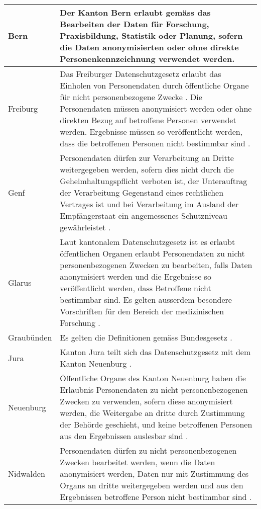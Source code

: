 \begin{longtable}{| p{} | p{}|}
		\hline
    Bern & Der Kanton Bern erlaubt gemäss \parencite[§§ 15 Abs. 1]{DSSGBERN} das Bearbeiten der Daten für Forschung, Praxisbildung, Statistik oder Planung, sofern die Daten anonymisierten oder ohne direkte Personenkennzeichnung verwendet werden. \\
		\hline
		Freiburg & Das Freiburger Datenschutzgesetz erlaubt das Einholen von Personendaten durch öffentliche Organe für nicht personenbezogene Zwecke \parencite[§§ 14 Abs. 1]{DSSGFR}. Die Personendaten müssen anonymisiert werden oder ohne direkten Bezug auf betroffene Personen verwendet werden. Ergebnisse müssen so veröffentlicht werden, dass die betroffenen Personen nicht bestimmbar sind \parencite[§ 16 Abs. 1-2]{DSSGFR}.  \\
		\hline
    Genf & Personendaten dürfen zur Verarbeitung an Dritte weitergegeben werden, sofern dies nicht durch die Geheimhaltungspflicht verboten ist, der Unterauftrag der Verarbeitung Gegenstand eines rechtlichen Vertrages ist und bei Verarbeitung im Ausland der Empfängerstaat ein angemessenes Schutzniveau gewährleistet \parencite[§§ 13A Abs. 1-5]{DSSGGE}. \\
		\hline
		Glarus & Laut kantonalem Datenschutzgesetz ist es erlaubt öffentlichen Organen erlaubt Personendaten zu nicht personenbezogenen Zwecken zu bearbeiten, falls Daten anonymisiert werden und die Ergebnisse so veröffentlicht werden, dass Betroffene nicht bestimmbar sind. Es gelten ausserdem besondere Vorschriften für den Bereich der medizinischen Forschung \parencite[§§ 11 Abs 1-2]{DSSGGL}. \\
		\hline
		Graubünden & Es gelten die Definitionen gemäss Bundesgesetz \parencite[§§ 2 Abs. 2-3]{DSSGGR}.  \\
		\hline
		Jura & Kanton Jura teilt sich das Datenschutzgesetz mit dem Kanton Neuenburg \parencite[S. 1 Abs. 2]{JURAAbkommenNE}. \\
		\hline
		Neuenburg & Öffentliche Organe des Kanton Neuenburg haben die Erlaubnis Personendaten zu nicht personenbezogenen Zwecken zu verwenden, sofern diese anonymisiert werden, die Weitergabe an dritte durch Zustimmung der Behörde geschieht, und keine betroffenen Personen aus den Ergebnissen auslesbar sind \parencite[§§ 25 Abs. 1]{DSSGNE}. \\
		\hline
		Nidwalden & Personendaten dürfen zu nicht personenbezogenen Zwecken bearbeitet werden, wenn die Daten anonymisiert werden, Daten nur mit Zustimmung des Organs an dritte weitergegeben werden und aus den Ergebnissen betroffene Person nicht bestimmbar sind \parencite[§§ 16 Abs 1-2]{DSSGNW}. \\

\end{longtable}
